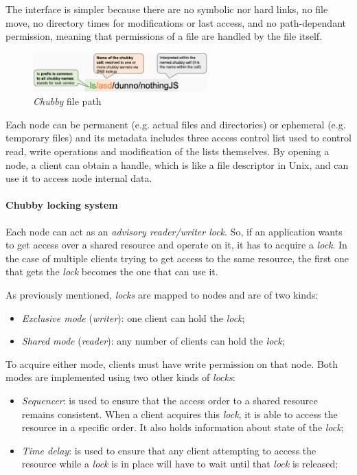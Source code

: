 The interface is simpler because there are no symbolic nor hard links, no file
move, no directory times for modifications or last access, and no path-dependant
permission, meaning that permissions of a file are handled by the file itself.

\begin{figure}[h!]
    \centering
    \includegraphics[width=0.6\textwidth]{images/chubby-design-fs.png}
    \caption{\emph{Chubby} file path}
\end{figure}

\noindent
Each node can be permanent (e.g. actual files and directories) or ephemeral
(e.g. temporary files) and its metadata includes three access control list
used to control read, write operations and modification of the lists themselves.
By opening a node, a client can obtain a handle, which is like a file descriptor
in Unix, and can use it to access node internal data.

\paragraph{Chubby locking system}
Each node can act as an \emph{advisory reader/writer lock}. So, if an application
wants to get access over a shared resource and operate on it, it has to acquire a
\emph{lock}. In the case of multiple clients trying to get access to the same
resource, the first one that gets the \emph{lock} becomes the one that can use it.

As previously mentioned, \emph{locks} are mapped to nodes and are of two
kinds:
\begin{itemize}
    \item \emph{Exclusive mode} (\emph{writer}): one client can hold the
    \emph{lock};
    \item \emph{Shared mode} (\emph{reader}): any number of clients can hold
    the \emph{lock};
\end{itemize}
To acquire either mode, clients must have write permission on that node.
Both modes are implemented using two other kinds of \emph{locks}:
\begin{itemize}
    \item \emph{Sequencer}: is used to ensure that the access order to a
    shared resource remains consistent. When a client acquires this \emph{lock},
    it is able to access the resource in a specific order. It also holds
    information about state of the \emph{lock};
    \item \emph{Time delay}: is used to ensure that any client attempting to
    access the resource while a \emph{lock} is in place will have to wait until
    that \emph{lock} is released;
\end{itemize}

